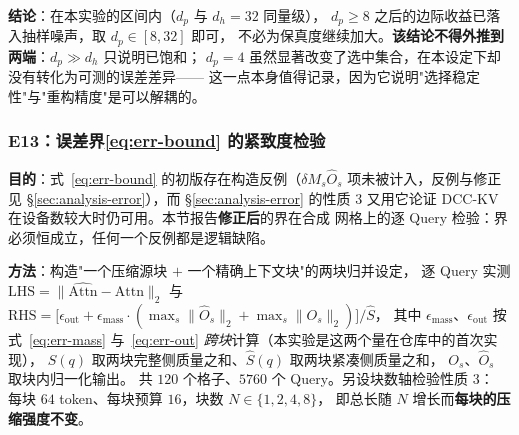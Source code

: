 \textbf{结论}：在本实验的区间内（$d_p$ 与 $d_h=32$ 同量级），
$d_p\ge8$ 之后的边际收益已落入抽样噪声，取 $d_p\in[8,32]$ 即可，
不必为保真度继续加大。\textbf{该结论不得外推到两端}：$d_p\gg d_h$ 只说明已饱和；
$d_p=4$ 虽然显著改变了选中集合，在本设定下却没有转化为可测的误差差异——
这一点本身值得记录，因为它说明"选择稳定性"与"重构精度"是可以解耦的。

\subsubsection{E13：误差界\eqref{eq:err-bound} 的紧致度检验}
\label{sec:exp-e13}

\textbf{目的}：式~\eqref{eq:err-bound} 的初版存在构造反例（$\delta M_s\widehat{O}_s$
项未被计入，反例与修正见 \S\ref{sec:analysis-error}），而 \S\ref{sec:analysis-error}
的性质 3 又用它论证 DCC-KV 在设备数较大时仍可用。本节报告\textbf{修正后}的界在合成
网格上的逐 Query 检验：界必须恒成立，任何一个反例都是逻辑缺陷。

\textbf{方法}：构造"一个压缩源块 $+$ 一个精确上下文块"的两块归并设定，
逐 Query 实测
$\mathrm{LHS}=\|\widehat{\mathrm{Attn}}-\mathrm{Attn}\|_2$ 与
$\mathrm{RHS}=\big[\epsilon_{\text{out}}+\epsilon_{\text{mass}}\cdot(\max_s\|\widehat{O}_s\|_2+\max_s\|O_s\|_2)\big]/\widehat{S}$，
其中 $\epsilon_{\text{mass}}$、$\epsilon_{\text{out}}$ 按式~\eqref{eq:err-mass}
与~\eqref{eq:err-out} \emph{跨块}计算（本实验是这两个量在仓库中的首次实现），
$S(q)$ 取两块完整侧质量之和、$\widehat{S}(q)$ 取两块紧凑侧质量之和，
$O_s$、$\widehat{O}_s$ 取块内归一化输出。
共 $120$ 个格子、$5760$ 个 Query。另设块数轴检验性质 3：
每块 $64$ token、每块预算 $16$，块数 $N\in\{1,2,4,8\}$，
即总长随 $N$ 增长而\textbf{每块的压缩强度不变}。

